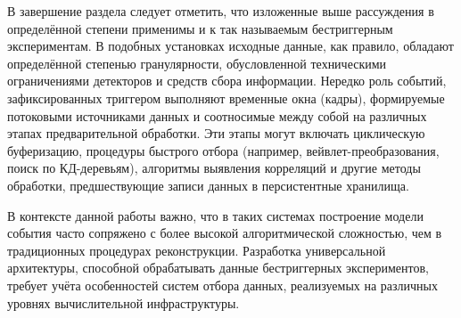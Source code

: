 В завершение раздела следует отметить, что изложенные выше рассуждения в
определённой степени применимы и к так называемым бестриггерным
экспериментам. В подобных установках исходные данные, как правило,
обладают определённой степенью гранулярности, обусловленной
техническими ограничениями детекторов и средств сбора
информации. Нередко роль событий, зафиксированных триггером
выполняют временные окна (кадры), формируемые потоковыми источниками
данных и соотносимые между собой на различных этапах предварительной
обработки. Эти этапы могут включать циклическую буферизацию,
процедуры быстрого отбора (например, вейвлет-преобразования, поиск по
КД-деревьям), алгоритмы выявления корреляций и другие методы
обработки, предшествующие записи данных в персистентные хранилища.

В контексте данной работы важно, что в таких системах построение
модели события часто сопряжено с более высокой алгоритмической сложностью,
чем в традиционных процедурах реконструкции. Разработка универсальной
архитектуры, способной обрабатывать данные бестриггерных
экспериментов, требует учёта особенностей систем отбора
данных, реализуемых на различных уровнях вычислительной инфраструктуры.
